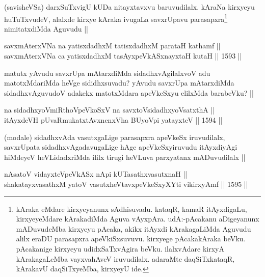 \begin{artha}
(savisheVSa) darxSuTxvigU kUDa nitayxtavxvu baruvudilalx. kAraNa kirxyeyu huTuTxvudeV, alalxde kirxye kAraka ivugaLa savxrUpavu parasapxra\footnote{kAraka eMdare kirxyeyanunx sAdhisuvadu. kataqR, kamaR itAyxdigaLu, kirxyeyeMdare kArakadiMda Aguva vAyxpAra. udA:-pAcakanu aDigeyanunx mADuvudeMba kirxyeyu pAcaka, akikx itAyxdi kArakagaLiMda Aguvudu alilx eraDU parasapxra apeVkiSxsuvuvu. kirxyege pAcakakAraka beVku. pAcakanige kirxyeyu udidxSaTxvAgira beVku. ilalxvAdare kirxyA kArakagaLeMba vayxvahAveV iruvudilalx. adaraMte daqSiTxkataqR, kArakavU daqSiTxyeMba, kirxyeyU ide.} nimitatxdiMda Aguvudu ||
\end{artha}


\begin{shl}
savxmAterxVNa na yatisxdadhxM tatisxdadhxM parataH kathamf || \\
savxmAterxVNa ca yatisxdadhxM tasAyxpeVkASx\s nayxtaH kutaH \hfill || 1593 ||  
\end{shl}

\begin{artha}
matutx yAvudu savxrUpa mAtarxdiMda sidadhxvAgilalxvoV adu matotxMdariMda heVge sididhxsuvadu? yAvudu savxrUpa mAtarxdiMda sidadhxvAguvudoV adakekx matotxMdara apeVkeSxyu elilxMda barabeVku? ||
\end{artha}


\begin{shl}
na sidadhxyoVmiRthoV\s peVkoSxV na savxtoV\s sidadhxyoVsatxthA  || \\
itAyxdeVH pUvaRmukatxtAvxnenxVha BUyoV\s pi yatayxteV \hfill || 1594 ||  
\end{shl}

\begin{artha}
(modale) sidadhxvAda vasutxgaLige parasapxra apeVkeSx iruvudilalx, savxrUpata sidadhxvAgadavugaLige hAge apeVkeSxyiruvudu itAyxdiyAgi hiMdeyeV heVLidadxriMda ililx tirugi heVLuva parxyatanx mADuvudilalx ||
\end{artha}


\begin{shl}
nAsatoV vidayxteV\s peVkASx nApi kUTasathxvasutxnaH || \\
shakatayxvasathxM yatoV vasutxheVtavxpeVkeSxyXYti vikirxyAmf \hfill || 1595 ||  
\end{shl}

